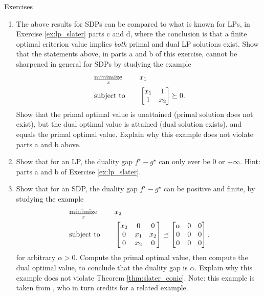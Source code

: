 \begin{xcb}{Exercises}
\begin{enumerate}[label=\thechapter.\arabic*]
\begin{enumerate}[label=\alph*.]
\item The above results for SDPs can be compared to what is known for LPs, in
  Exercise \ref{ex:lp_slater} parts c and d, where the conclusion is that a
  finite optimal criterion value implies \emph{both} primal and dual LP 
  solutions exist. Show that the statements above, in parts a and b of this
  exercise, cannot be sharpened in general for SDPs by studying the example        
  \begin{alignat*}{2}
   &\operatorname*{minimize}_x \quad && x_1 \\
   &\operatorname{subject\,\,to} \quad && 
   \begin{bmatrix}
   x_1 & 1 \\
   1 & x_2 
 \end{bmatrix} \succeq 0.  
  \end{alignat*}
  Show that the primal optimal value is unattained (primal solution does not
  exist), but the dual optimal value is attained (dual solution exists), and
  equals the primal optimal value. Explain why this example does not violate
  parts a and b above. 

\item Show that for an LP, the duality gap $f^\star - g^\star$ can only ever be
  $0$ or $+\infty$. Hint: parts a and b of Exercise \ref{ex:lp_slater}. 

\item Show that for an SDP, the duality gap $f^\star - g^\star$ can be positive
  and finite, by studying the example 
  \begin{alignat*}{2}
   &\operatorname*{minimize}_x \quad && x_2 \\
   &\operatorname{subject\,\,to} \quad && 
   \begin{bmatrix}
   x_2 & 0 & 0 \\
   0 & x_1 & x_2 \\
   0 & x_2 & 0 
 \end{bmatrix} \preceq  
 \begin{bmatrix}
  \alpha & 0 & 0 \\
  0 & 0 & 0 \\
  0 & 0 & 0 
 \end{bmatrix}.
  \end{alignat*}
  for arbitrary $\alpha > 0$. Compute the primal optimal value, then compute the
  dual optimal value, to conclude that the duality gap is $\alpha$. Explain why 
  this example does not violate Theorem \ref{thm:slater_conic}.  Note: this
  example is taken from \cite{ramana1997exact}, who in turn credits
  \cite{vandenberghe1996semidefinite} for a related example.  
\end{enumerate}
\end{enumerate}
\end{xcb}
